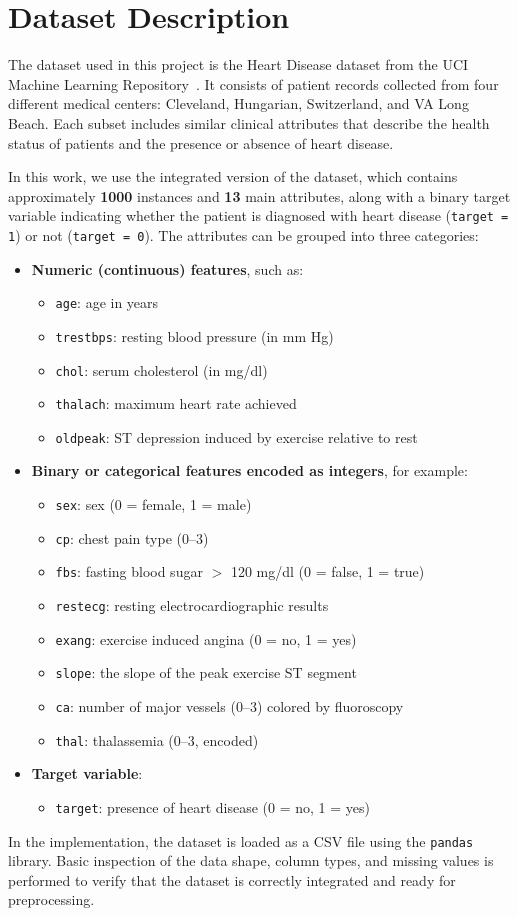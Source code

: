 \section{Dataset Description}
The dataset used in this project is the Heart Disease dataset from the UCI Machine Learning Repository~\cite{uci}.
It consists of patient records collected from four different medical centers: Cleveland, Hungarian,
Switzerland, and VA Long Beach. Each subset includes similar clinical attributes that describe the health
status of patients and the presence or absence of heart disease.

In this work, we use the integrated version of the dataset, which contains approximately
\textbf{1000} instances and \textbf{13} main attributes, along with a binary target variable indicating
whether the patient is diagnosed with heart disease (\texttt{target = 1}) or not (\texttt{target = 0}).
The attributes can be grouped into three categories:

\begin{itemize}
	\item \textbf{Numeric (continuous) features}, such as:
	\begin{itemize}
		\item \texttt{age}: age in years
		\item \texttt{trestbps}: resting blood pressure (in mm Hg)
		\item \texttt{chol}: serum cholesterol (in mg/dl)
		\item \texttt{thalach}: maximum heart rate achieved
		\item \texttt{oldpeak}: ST depression induced by exercise relative to rest
	\end{itemize}
	\item \textbf{Binary or categorical features encoded as integers}, for example:
	\begin{itemize}
		\item \texttt{sex}: sex (0 = female, 1 = male)
		\item \texttt{cp}: chest pain type (0--3)
		\item \texttt{fbs}: fasting blood sugar $>$ 120 mg/dl (0 = false, 1 = true)
		\item \texttt{restecg}: resting electrocardiographic results
		\item \texttt{exang}: exercise induced angina (0 = no, 1 = yes)
		\item \texttt{slope}: the slope of the peak exercise ST segment
		\item \texttt{ca}: number of major vessels (0--3) colored by fluoroscopy
		\item \texttt{thal}: thalassemia (0–3, encoded)
	\end{itemize}
	\item \textbf{Target variable}:
	\begin{itemize}
		\item \texttt{target}: presence of heart disease (0 = no, 1 = yes)
	\end{itemize}
\end{itemize}

In the implementation, the dataset is loaded as a CSV file using the \texttt{pandas} library.
Basic inspection of the data shape, column types, and missing values is performed to verify
that the dataset is correctly integrated and ready for preprocessing.